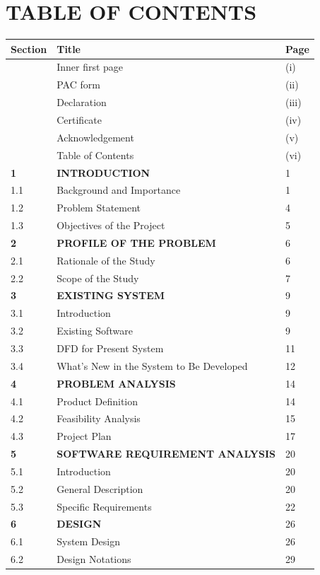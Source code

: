 \documentclass[12pt, a4paper]{report}
\begin{document}
\section{TABLE OF CONTENTS}
\begin{table}[htbp]
\centering
\small
\begin{tabularx}{\textwidth}{|X|X|X|}
\hline
Section & Title & Page \\
\hline
 & Inner first page & (i) \\
 & PAC form & (ii) \\
 & Declaration & (iii) \\
 & Certificate & (iv) \\
 & Acknowledgement & (v) \\
 & Table of Contents & (vi) \\
\textbf{1} & \textbf{INTRODUCTION} & 1 \\
1.1 & Background and Importance & 1 \\
1.2 & Problem Statement & 4 \\
1.3 & Objectives of the Project & 5 \\
\textbf{2} & \textbf{PROFILE OF THE PROBLEM} & 6 \\
2.1 & Rationale of the Study & 6 \\
2.2 & Scope of the Study & 7 \\
\textbf{3} & \textbf{EXISTING SYSTEM} & 9 \\
3.1 & Introduction & 9 \\
3.2 & Existing Software & 9 \\
3.3 & DFD for Present System & 11 \\
3.4 & What's New in the System to Be Developed & 12 \\
\textbf{4} & \textbf{PROBLEM ANALYSIS} & 14 \\
4.1 & Product Definition & 14 \\
4.2 & Feasibility Analysis & 15 \\
4.3 & Project Plan & 17 \\
\textbf{5} & \textbf{SOFTWARE REQUIREMENT ANALYSIS} & 20 \\
5.1 & Introduction & 20 \\
5.2 & General Description & 20 \\
5.3 & Specific Requirements & 22 \\
\textbf{6} & \textbf{DESIGN} & 26 \\
6.1 & System Design & 26 \\
6.2 & Design Notations & 29 \\

\end{tabularx}
\end{table}
\end{document}
